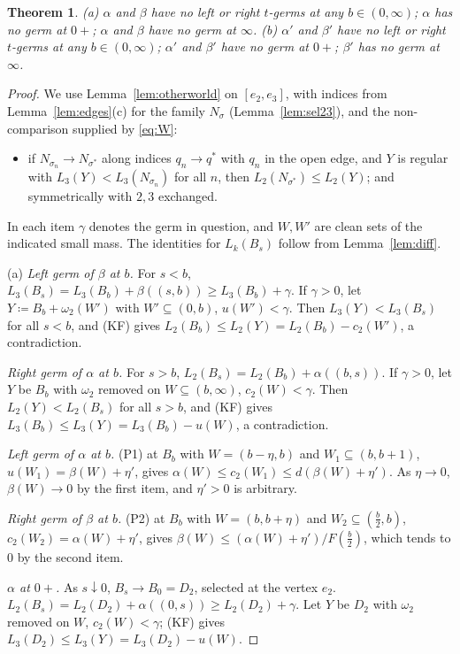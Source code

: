 \documentclass[11pt]{article}
\newtheorem{theorem}{Theorem}
\theoremstyle{definition}\newtheorem{definition}[theorem]{Definition}
\theoremstyle{remark}\newtheorem{remark}[theorem]{Remark}
\begin{document}
\begin{theorem}\label{thm:tgerms}
(a) $\alpha$ and $\beta$ have no left or right $t$-germs at any
$b\in(0,\infty)$; $\alpha$ has no germ at $0+$; $\alpha$ and $\beta$ have no
germ at $\infty$. (b) $\alpha'$ and $\beta'$ have no left or right $t$-germs
at any $b\in(0,\infty)$; $\alpha'$ and $\beta'$ have no germ at $0+$;
$\beta'$ has no germ at $\infty$.
\end{theorem}
\begin{proof}
We use Lemma~\ref{lem:otherworld} on $[e_2,e_3]$, with indices from
Lemma~\ref{lem:edges}(c) for the family $N_\sigma$
(Lemma~\ref{lem:sel23}), and the non-comparison supplied by \eqref{eq:W}:
\begin{itemize}[leftmargin=*,itemsep=1pt]
\item[(KF)] if $N_{\sigma_n}\to N_{\sigma^*}$ along indices $q_n\to q^*$
with $q_n$ in the open edge, and $Y$ is regular with
$L_3(Y)<L_3(N_{\sigma_n})$ for all $n$, then $L_2(N_{\sigma^*})\le L_2(Y)$;
and symmetrically with $2,3$ exchanged.
\end{itemize}
In each item $\gamma$ denotes the germ in question, and $W,W'$ are clean
sets of the indicated small mass. The identities for $L_k(B_s)$ follow from
Lemma~\ref{lem:diff}.

(a) \emph{Left germ of $\beta$ at $b$.} For $s<b$,
$L_3(B_s)=L_3(B_b)+\beta((s,b))\ge L_3(B_b)+\gamma$. If $\gamma>0$, let
$Y\coloneqq B_b+\omega_2(W')$ with $W'\subseteq(0,b)$, $u(W')<\gamma$. Then
$L_3(Y)<L_3(B_s)$ for all $s<b$, and (KF) gives $L_2(B_b)\le L_2(Y)=
L_2(B_b)-c_2(W')$, a contradiction.

\emph{Right germ of $\alpha$ at $b$.} For $s>b$,
$L_2(B_s)=L_2(B_b)+\alpha((b,s))$. If $\gamma>0$, let $Y$ be $B_b$ with
$\omega_2$ removed on $W\subseteq(b,\infty)$, $c_2(W)<\gamma$. Then
$L_2(Y)<L_2(B_s)$ for all $s>b$, and (KF) gives $L_3(B_b)\le L_3(Y)=L_3(B_b)-
u(W)$, a contradiction.

\emph{Left germ of $\alpha$ at $b$.} (P1) at $B_b$ with $W=(b-\eta,b)$ and
$W_1\subseteq(b,b+1)$, $u(W_1)=\beta(W)+\eta'$, gives $\alpha(W)\le
c_2(W_1)\le d(\beta(W)+\eta')$. As $\eta\to0$, $\beta(W)\to0$ by the first
item, and $\eta'>0$ is arbitrary.

\emph{Right germ of $\beta$ at $b$.} (P2) at $B_b$ with $W=(b,b+\eta)$ and
$W_2\subseteq(\frac b2,b)$, $c_2(W_2)=\alpha(W)+\eta'$, gives $\beta(W)\le
(\alpha(W)+\eta')/F(\frac b2)$, which tends to $0$ by the second item.

\emph{$\alpha$ at $0+$.} As $s\downarrow0$, $B_s\to B_0=D_2$, selected at the
vertex $e_2$. $L_2(B_s)=L_2(D_2)+\alpha((0,s))\ge L_2(D_2)+\gamma$. Let $Y$ be
$D_2$ with $\omega_2$ removed on $W$, $c_2(W)<\gamma$; (KF) gives
$L_3(D_2)\le L_3(Y)=L_3(D_2)-u(W)$.


\end{proof}
\end{document}

